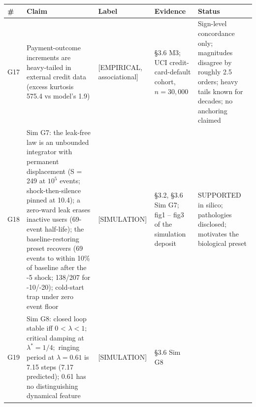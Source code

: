 \documentclass[
]{article}
\newcounter{none} %
\begin{document}
{\def\LTcaptype{none} %
\begin{longtable}[]{@{}
  >{\raggedright\arraybackslash}p{}
  >{\raggedright\arraybackslash}p{}
  >{\raggedright\arraybackslash}p{}
  >{\raggedright\arraybackslash}p{}
  >{\raggedright\arraybackslash}p{}@{}}
\toprule\noalign{}
\begin{minipage}[b]{\linewidth}\raggedright
\textbf{\#}
\end{minipage} & \begin{minipage}[b]{\linewidth}\raggedright
\textbf{Claim}
\end{minipage} & \begin{minipage}[b]{\linewidth}\raggedright
\textbf{Label}
\end{minipage} & \begin{minipage}[b]{\linewidth}\raggedright
\textbf{Evidence}
\end{minipage} & \begin{minipage}[b]{\linewidth}\raggedright
\textbf{Status}
\end{minipage} \\
\midrule\noalign{}
\endhead
\bottomrule\noalign{}
\endlastfoot
G17 & Payment-outcome increments are heavy-tailed in external credit
data (excess kurtosis 575.4 vs model's 1.9) & {[}EMPIRICAL,
associational{]} & §3.6 M3; UCI credit-card-default cohort,
\(n = 30,000\) & Sign-level concordance only; magnitudes disagree by
roughly 2.5 orders; heavy tails known for decades; no anchoring
claimed \\
G18 & Sim G7: the leak-free law is an unbounded integrator with
permanent displacement (S = 249 at \(10^{5}\) events; shock-then-silence
pinned at 10.4); a zero-ward leak erases inactive users (69-event
half-life); the baseline-restoring preset recovers (69 events to within
10\% of baseline after the -5 shock; 138/207 for -10/-20); cold-start
trap under zero event floor & {[}SIMULATION{]} & §3.2, §3.6 Sim G7; fig1
-- fig3 of the simulation deposit & SUPPORTED in silico; pathologies
disclosed; motivates the biological preset \\
G19 & Sim G8: closed loop stable iff 0 \textless{} \(\lambda < 1;\)
critical damping at \(\lambda^{*} = 1/4;\) ringing period at
\(\lambda = 0.61\) is 7.15 steps (7.17 predicted); 0.61 has no
distinguishing dynamical feature & {[}SIMULATION{]} & §3.6 Sim G8 &

\end{longtable}}
\end{document}
